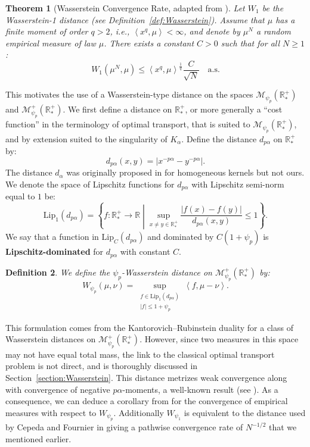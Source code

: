 \documentclass[11pt,a4paper]{article}
\newcommand{\RR}{\mathbb{R}}
\newcommand{\RRP}{\mathbb{R}^+_*}
\newcommand{\MC}{\mathcal{M}}
\newcommand{\brac}[1]{\left\langle#1\right\rangle}
\newtheorem{theorem}{Theorem}[section]
\newtheorem{definition}[theorem]{Definition}
\begin{document}
\begin{theorem}[Wasserstein Convergence Rate, adapted from {\cite{fournier2015rate}}]\label{thm:fournier-guillin}
Let $W_1$ be the Wasserstein-1 distance (see Definition~\ref{def:Wasserstein}). Assume that $\mu$ has a finite moment of order $q > 2$, i.e., $\brac{x^q,\mu} < \infty$, and denote by $\mu^N$ a random empirical measure of law $\mu$. There exists a constant $C > 0$ such that for all $N \geq 1$:
\[
W_1\left(\mu^N, \mu\right) \leq \brac{x^q,\mu}^{\frac{1}{q}} \dfrac{C}{\sqrt{N}} \quad \text{a.s.}
\]
\end{theorem}

This motivates the use of a Wasserstein-type distance on the spaces $\MC_{\psi_p}(\RRP)$ and $\MC^+_{\psi_p}(\RRP)$. We first define a distance on $\RRP$, or more generally a “cost function” in the terminology of optimal transport, that is suited to $\MC_{\psi_p}(\RRP)$, and by extension suited to the singularity of $K_\alpha$. Define the distance $d_{p\alpha}$ on $\RRP$ by:
\[
d_{p\alpha}(x, y) = |x^{-p\alpha} - y^{-p\alpha}|.
\]
The distance $d_{\alpha}$ was originally proposed in \cite{fournierDistanceCoagulation2006} for homogeneous kernels but not ours. We denote the space of Lipschitz functions for $d_{p\alpha}$ with Lipschitz semi-norm equal to $1$ be:
\[
\text{Lip}_1(d_{p\alpha}) = \left\lbrace f: \RRP \to \RR \middle| \sup_{x \neq y \in \RRP} \dfrac{|f(x) - f(y)|}{d_{p\alpha}(x, y)} \leq 1 \right\rbrace.
\]
We say that a function in $\text{Lip}_C(d_{p\alpha})$ and dominated by $C(1 + \psi_p)$ is \textbf{Lipschitz-dominated} for $d_{p\alpha}$ with constant $C$.
\begin{definition}
We define the $\psi_p$-Wasserstein distance on $\MC^+_{\psi_p}\left(\RRP \right)$ by:
\[
W_{\psi_p}(\mu, \nu) = \sup_{\substack{f \in \text{Lip}_1(d_{p\alpha}) \\ |f| \leq 1 + \psi_p}} \brac{f, \mu - \nu}.
\]
\end{definition}

This formulation comes from the Kantorovich–Rubinstein duality for a class of Wasserstein distances on $\MC^+_{\psi_p}(\RRP)$. However, since two measures in this space may not have equal total mass, the link to the classical optimal transport problem is not direct, and is thoroughly discussed in Section~\ref{section:Wasserstein}. This distance metrizes weak convergence along with convergence of negative $p\alpha$-moments, a well-known result (see \cite{villani2008optimal}). As a consequence, we can deduce a corollary from \cite{fournier2015rate} for the convergence of empirical measures with respect to $W_{\psi_p}$. Additionally $W_{\psi_1}$ is equivalent to the distance used by Cepeda and Fournier in \cite{cepedaSmoluchowskisEquationRate2011a} giving a pathwise convergence rate of $N^{-1/2}$ that we mentioned earlier.
\end{document}
